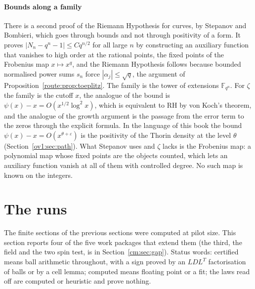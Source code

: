 \paragraph{Bounds along a family} There is a second proof of the Riemann Hypothesis for curves, by Stepanov and Bombieri, which goes through bounds and not through positivity of a form. It proves $|N_n-q^n-1|\le Cq^{n/2}$ for all large $n$ by constructing an auxiliary function that vanishes to high order at the rational points, the fixed points of the Frobenius map $x\mapsto x^q$, and the Riemann Hypothesis follows because bounded normalised power sums $s_n$ force $|\alpha_j|\le\sqrt q$, the argument of Proposition~\ref{route:prop:toeplitz}. The family is the tower of extensions $\mathbb F_{q^n}$. For $\zeta$ the family is the cutoff $x$, the analogue of the bound is $\psi(x)-x=O(x^{1/2}\log^2x)$, which is equivalent to RH by von Koch's theorem, and the analogue of the growth argument is the passage from the error term to the zeros through the explicit formula. In the language of this book the bound $\psi(x)-x=O(x^{\theta+\varepsilon})$ is the positivity of the Thorin density at the level $\theta$ (Section~\ref{ov1:sec:path}). What Stepanov uses and $\zeta$ lacks is the Frobenius map: a polynomial map whose fixed points are the objects counted, which lets an auxiliary function vanish at all of them with controlled degree. No such map is known on the integers.

\section{The runs}\label{route:sec:runs}

The finite sections of the previous sections were computed at pilot size. This section reports four of the five work packages that extend them (the third, the field and the two spin test, is in Section~\ref{cm:sec:gap}). Status words: certified means ball arithmetic throughout, with a sign proved by an $LDL^T$ factorisation of balls or by a cell lemma; computed means floating point or a fit; the laws read off are computed or heuristic and prove nothing.

